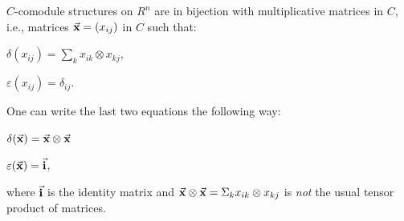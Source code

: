 \documentclass[8pt]{article}
\theoremstyle{definition}
\theoremstyle{definition}
\theoremstyle{definition}
\theoremstyle{definition}
\theoremstyle{definition}
\theoremstyle{definition}
\theoremstyle{definition}
\theoremstyle{definition}
\theoremstyle{definition}
\theoremstyle{definition}
\theoremstyle{definition}
\theoremstyle{definition}
\theoremstyle{definition}
\theoremstyle{definition}
\theoremstyle{question}
\begin{document}
$C$-comodule structures on $R^n$ are in bijection with multiplicative matrices in $C$, i.e., matrices $\vec{\bf x} = (x_{ij})$ in $C$
such that:
\begin{center}
  $\delta(x_{ij}) = \sum \limits_k x_{ik} \otimes x_{kj}$,

  $\varepsilon(x_{ij}) = \delta_{ij}$.
\end{center}
One can write the last two equations the following way:
\begin{center}
  $\delta(\vec{\bf x}) = \vec{\bf x} \otimes \vec{\bf x}$

  $\varepsilon(\vec{\bf x}) = \vec{\bf i}$,
\end{center}
where $\vec{\bf i}$ is the identity matrix and $\vec{\bf x} \otimes \vec{\bf x} = \Sigma_k x_{ik} \otimes x_{kj}$ is \emph{not}
the usual tensor product of matrices.
\end{document}
